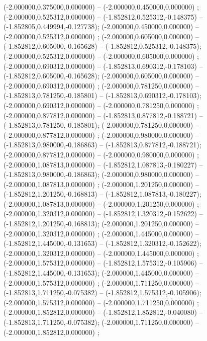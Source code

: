  (-2.000000,0.375000,0.000000) -- (-2.000000,0.450000,0.000000) ;
 (-2.000000,0.525312,0.000000) -- (-1.852812,0.525312,-0.148375) -- (-1.852805,0.449994,-0.127738);
 (-2.000000,0.450000,0.000000) -- (-2.000000,0.525312,0.000000) ;
 (-2.000000,0.605000,0.000000) -- (-1.852812,0.605000,-0.165628) -- (-1.852812,0.525312,-0.148375);
 (-2.000000,0.525312,0.000000) -- (-2.000000,0.605000,0.000000) ;
 (-2.000000,0.690312,0.000000) -- (-1.852813,0.690312,-0.178103) -- (-1.852812,0.605000,-0.165628);
 (-2.000000,0.605000,0.000000) -- (-2.000000,0.690312,0.000000) ;
 (-2.000000,0.781250,0.000000) -- (-1.852813,0.781250,-0.185801) -- (-1.852813,0.690312,-0.178103);
 (-2.000000,0.690312,0.000000) -- (-2.000000,0.781250,0.000000) ;
 (-2.000000,0.877812,0.000000) -- (-1.852813,0.877812,-0.188721) -- (-1.852813,0.781250,-0.185801);
 (-2.000000,0.781250,0.000000) -- (-2.000000,0.877812,0.000000) ;
 (-2.000000,0.980000,0.000000) -- (-1.852813,0.980000,-0.186863) -- (-1.852813,0.877812,-0.188721);
 (-2.000000,0.877812,0.000000) -- (-2.000000,0.980000,0.000000) ;
 (-2.000000,1.087813,0.000000) -- (-1.852812,1.087813,-0.180227) -- (-1.852813,0.980000,-0.186863);
 (-2.000000,0.980000,0.000000) -- (-2.000000,1.087813,0.000000) ;
 (-2.000000,1.201250,0.000000) -- (-1.852812,1.201250,-0.168813) -- (-1.852812,1.087813,-0.180227);
 (-2.000000,1.087813,0.000000) -- (-2.000000,1.201250,0.000000) ;
 (-2.000000,1.320312,0.000000) -- (-1.852812,1.320312,-0.152622) -- (-1.852812,1.201250,-0.168813);
 (-2.000000,1.201250,0.000000) -- (-2.000000,1.320312,0.000000) ;
 (-2.000000,1.445000,0.000000) -- (-1.852812,1.445000,-0.131653) -- (-1.852812,1.320312,-0.152622);
 (-2.000000,1.320312,0.000000) -- (-2.000000,1.445000,0.000000) ;
 (-2.000000,1.575312,0.000000) -- (-1.852812,1.575312,-0.105906) -- (-1.852812,1.445000,-0.131653);
 (-2.000000,1.445000,0.000000) -- (-2.000000,1.575312,0.000000) ;
 (-2.000000,1.711250,0.000000) -- (-1.852813,1.711250,-0.075382) -- (-1.852812,1.575312,-0.105906);
 (-2.000000,1.575312,0.000000) -- (-2.000000,1.711250,0.000000) ;
 (-2.000000,1.852812,0.000000) -- (-1.852812,1.852812,-0.040080) -- (-1.852813,1.711250,-0.075382);
 (-2.000000,1.711250,0.000000) -- (-2.000000,1.852812,0.000000) ;
